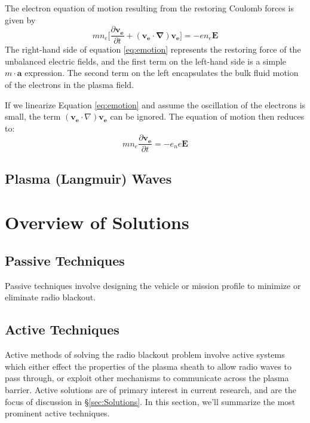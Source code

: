 \documentclass[twocolumn]{article}
\begin{document}
The electron equation of motion resulting from the restoring Coulomb forces is given by
\begin{equation} \label{eq:emotion}
	mn_e \lbrack \frac{\partial \mathbf{v_e}}{\partial t} + \left( \mathbf{v_e} \cdot \mathbf{\nabla} \right) \mathbf{v_e} \rbrack = -en_e\mathbf{E}
\end{equation}
The right-hand side of equation \ref{eq:emotion} represents the restoring force of the unbalanced electric fields, and the first term on the left-hand side is a simple $m\cdot\mathbf{a}$ expression.
The second term on the left encapsulates the bulk fluid motion of the electrons in the plasma field.

If we linearize Equation \ref{eq:emotion} and assume the oscillation of the electrons is small, the term $\left(\mathbf{v_e} \cdot \nabla \right) \mathbf{v_e}$ can be ignored.
The equation of motion then reduces to:
\begin{equation}
	mn_e \frac{\partial \mathbf{v_e}}{\partial t} = -e_ne \mathbf{E}
\end{equation}

\subsection*{Plasma (Langmuir) Waves}



\section{Overview of Solutions} \label{sec:Overview}
\subsection*{Passive Techniques}
	Passive techniques involve designing the vehicle or mission profile to minimize or eliminate radio blackout.
\subsection*{Active Techniques}
	Active methods of solving the radio blackout problem involve active systems which either effect the properties of the plasma sheath to allow radio waves to pass through, or exploit other mechanisms to communicate across the plasma barrier.
	Active solutions are of primary interest in current research, and are the focus of discussion in \S\ref{sec:Solutions}.
	In this section, we'll summarize the most prominent active techniques.
	
\end{document}
